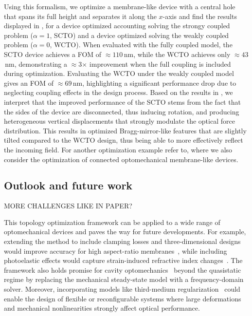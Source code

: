 Using this formalism, we optimize a membrane-like device with a central hole that spans its full height and separates it along the $x$-axis and find
    the results displayed in , for a device optimized accounting solving the strongy coupled problem ($\alpha = 1$, SCTO) and a device optimized solving the weakly coupled problem ($\alpha = 0$, WCTO).
    When evaluated with the fully coupled model, the SCTO device achieves a FOM of $\approx 110$\,nm, while the WCTO achieves only
     $\approx 43$\,nm, demonstrating a $\approx$3$\times$ improvement when the full coupling
      is included during optimization. Evaluating the WCTO under the
       weakly coupled model gives an FOM of $\approx$69\,nm, highlighting
        a significant performance drop due to neglecting coupling effects in the design process. 
        Based on the results in , we interpret that the improved performance of the SCTO stems from the fact that the sides of the device are disconnected,
         thus inducing rotation, and producing heterogeneous vertical displacements that strongly modulate 
         the optical force distribution. This results in optimized Bragg-mirror-like features that are slightly tilted compared to the WCTO design, thus being able to more effectively reflect the incoming field. For another
         optimization example refer to, where we also consider the optimization of connected optomechanical membrane-like devices.

\subsection*{Outlook and future work}

MORE CHALLENGES LIKE IN PAPER?

This topology optimization framework can be applied to a wide
 range of optomechanical devices and paves the way for future developments. 
 For example, extending the method to include clamping losses and three-dimensional designs
  would improve accuracy for high aspect-ratio membranes~\cite{aspect_ratio}, while including
   photoelastic effects would capture strain-induced refractive index changes~\cite{photoelasticity}.
    The framework also holds promise for cavity optomechanics~\cite{cav_opt} beyond the quasistatic
     regime by replacing the mechanical steady-state model with a frequency-domain solver. 
     Moreover, incorporating models like third-medium regularization~\cite{HuHu0} could enable the design of
      flexible or reconfigurable systems where large deformations and mechanical nonlinearities
       strongly affect optical performance.


